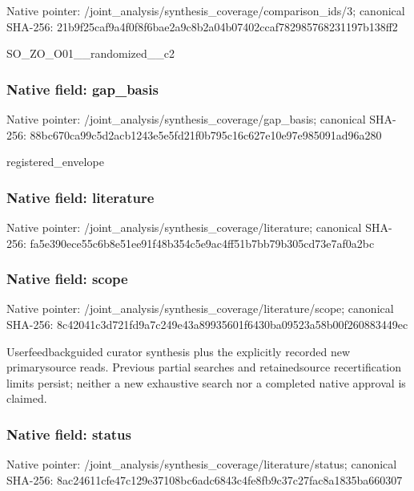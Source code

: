 \documentclass[10pt,a4paper]{article}
\begin{document}
Native pointer: /joint\_analysis/synthesi\allowbreak{}s\_coverage/comparison\_id\allowbreak{}s/3; canonical SHA-256: 21b9f25caf9a4f0f8f6bae2a\allowbreak{}9c8b2a04b07402ccaf782985\allowbreak{}768231197b138ff2


SO\_ZO\_O01\_\_randomized\_\_c2


\subsubsection{Native field: gap\_basis}


Native pointer: /joint\_analysis/synthesi\allowbreak{}s\_coverage/gap\_basis; canonical SHA-256: 88bc670ca99c5d2acb1243e5\allowbreak{}e5fd21f0b795c16c627e10e9\allowbreak{}7e985091ad96a280


registered\_envelope


\subsubsection{Native field: literature}


Native pointer: /joint\_analysis/synthesi\allowbreak{}s\_coverage/literature; canonical SHA-256: fa5e390ece55c6b8e51ee91f\allowbreak{}48b354c5e9ac4ff51b7bb79b\allowbreak{}305cd73e7af0a2bc



\subsubsection{Native field: scope}


Native pointer: /joint\_analysis/synthesi\allowbreak{}s\_coverage/literature/sc\allowbreak{}ope; canonical SHA-256: 8c42041c3d721fd9a7c249e4\allowbreak{}3a89935601f6430ba09523a5\allowbreak{}8b00f260883449ec


Userfeedbackguided curator synthesis plus the explicitly recorded new primarysource reads. Previous partial searches and retainedsource recertification limits persist; neither a new exhaustive search nor a completed native approval is claimed.


\subsubsection{Native field: status}


Native pointer: /joint\_analysis/synthesi\allowbreak{}s\_coverage/literature/st\allowbreak{}atus; canonical SHA-256: 8ac24611cfe47c129e37108b\allowbreak{}c6adc6843c4fe8fb9c37c27f\allowbreak{}ac8a1835ba660307
\end{document}
